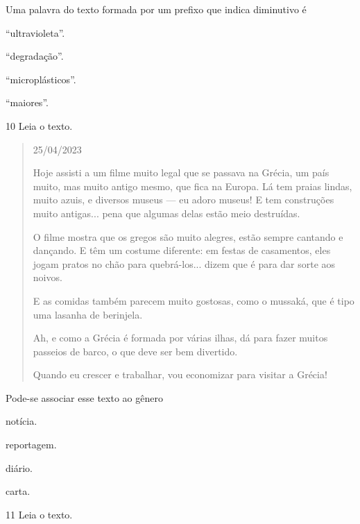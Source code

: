 Uma palavra do texto formada por um prefixo que indica diminutivo é

\begin{escolha}
\item ``ultravioleta''.

\item ``degradação''.

\item ``microplásticos''.

\item ``maiores''.
\end{escolha}


\num{10} Leia o texto.

\begin{quote}
25/04/2023

Hoje assisti a um filme muito legal que se passava na Grécia, um país
muito, mas muito antigo mesmo, que fica na Europa. Lá tem praias lindas,
muito azuis, e diversos museus --- eu adoro museus! E tem
construções muito antigas... pena que algumas delas estão meio
destruídas.

O filme mostra que os gregos são muito alegres, estão sempre cantando e
dançando. E têm um costume diferente: em festas de casamentos, eles
jogam pratos no chão para quebrá-los... dizem que é para dar sorte aos
noivos.

E as comidas também parecem muito gostosas, como o mussaká, que é tipo
uma lasanha de berinjela.

Ah, e como a Grécia é formada por várias ilhas, dá para fazer muitos
passeios de barco, o que deve ser bem divertido.

Quando eu crescer e trabalhar, vou economizar para visitar a Grécia!

\end{quote}

Pode-se associar esse texto ao gênero

\begin{escolha}
\item notícia.

\item reportagem.

\item diário.

\item carta.
\end{escolha}

\num{11} Leia o texto.

